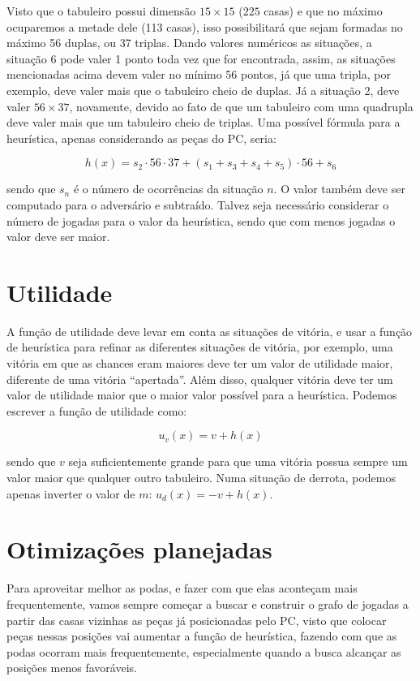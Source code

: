 \documentclass{article}
\begin{document}
Visto que o tabuleiro possui dimensão $15\times15$ ($225$ casas) e que no
máximo ocuparemos a metade dele (113 casas), isso possibilitará que sejam
formadas no máximo 56 duplas, ou 37 triplas. Dando valores numéricos as
situações, a situação 6 pode valer 1 ponto toda vez que for encontrada, assim,
as situações mencionadas acima devem valer no mínimo 56 pontos, já que uma
tripla, por exemplo, deve valer mais que o tabuleiro cheio de duplas. Já a
situação 2, deve valer $56 \times 37$, novamente, devido ao fato de que um
tabuleiro com uma quadrupla deve valer mais que um tabuleiro cheio de triplas.
Uma possível fórmula para a heurística, apenas considerando as peças do PC,
seria:

$$h(x) = s_2 \cdot 56 \cdot 37 + (s_1 + s_3 + s_4 + s_5) \cdot 56 + s_6$$

sendo que $s_n$ é o número de ocorrências da situação $n$. O valor também deve
ser computado para o adversário e subtraído. Talvez seja necessário considerar
o número de jogadas para o valor da heurística, sendo que com menos jogadas o
valor deve ser maior.

\section{Utilidade}

A função de utilidade deve levar em conta as situações de vitória, e usar a
função de heurística para refinar as diferentes situações de vitória, por
exemplo, uma vitória em que as chances eram maiores deve ter um valor de
utilidade maior, diferente de uma vitória ``apertada''. Além disso, qualquer
vitória deve ter um valor de utilidade maior que o maior valor possível para a
heurística. Podemos escrever a função de utilidade como:

$$u_v(x) = v + h(x)$$

sendo que $v$ seja suficientemente grande para que uma vitória possua sempre um
valor maior que qualquer outro tabuleiro. Numa situação de derrota, podemos
apenas inverter o valor de $m$: $u_d(x) = - v + h(x)$.

\section{Otimizações planejadas}

Para aproveitar melhor as podas, e fazer com que elas aconteçam mais
frequentemente, vamos sempre começar a buscar e construir o grafo de jogadas a
partir das casas vizinhas as peças já posicionadas pelo PC, visto que colocar
peças nessas posições vai aumentar a função de heurística, fazendo com que as
podas ocorram mais frequentemente, especialmente quando a busca alcançar as
posições menos favoráveis.



\end{document}
